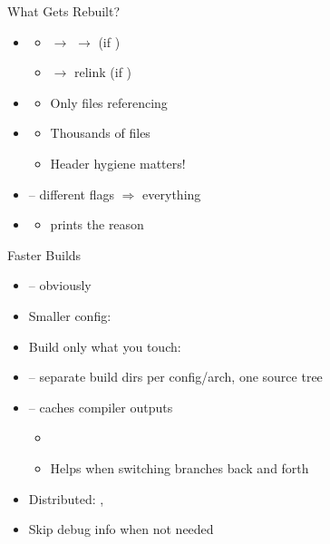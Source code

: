 \begin{frame}{What Gets Rebuilt?}

  \begin{itemize}[<+->]
    \item {}
      \begin{itemize}[<.->]
	\item {} $\rightarrow$  $\rightarrow$ 
	  (if )
	\item {} $\rightarrow$  relink (if )
      \end{itemize}
    \item {}
      \begin{itemize}[<.->]
	\item Only files referencing 
      \end{itemize}
    \item {}
      \begin{itemize}[<.->]
	\item Thousands of files
	\item Header hygiene matters!
      \end{itemize}
    \item {} -- different flags $\Rightarrow$ everything
    \item {}
      \begin{itemize}[<.->]
	\item {} prints the reason
      \end{itemize}
  \end{itemize}

\end{frame}

\begin{frame}{Faster Builds}

  \begin{itemize}[<+->]
    \item {} -- obviously
    \item Smaller config: 
    \item Build only what you touch: 
    \item {} -- separate build dirs per config/arch, one source tree
    \item {} -- caches compiler outputs
      \begin{itemize}[<.->]
	\item {}
	\item Helps when switching branches back and forth
      \end{itemize}
    \item Distributed: , 
    \item Skip debug info when not needed
  \end{itemize}

\end{frame}
